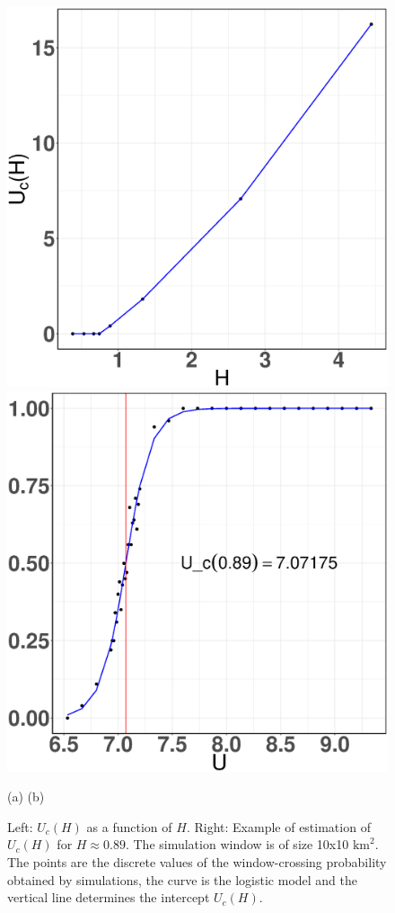 \documentclass[conference]{IEEEtran}
\begin{document}
\begin{figure}[t!]
\centerline{
\includegraphics[width=0.48\linewidth]{Figures/Uc-general-curve}
\hspace{0.01\linewidth}
\includegraphics[width=0.48\linewidth]{Figures/Uc-example}}
\vspace{-1ex}
\centerline{\footnotesize\hspace{0.25\linewidth} (a)\hspace{0.5\linewidth} (b) \hspace{0.25\linewidth}\ }
\vspace{-1ex}
\caption{Left: $U_c(H)$ as a function of $H$. Right: Example of estimation of $U_{c}(H)$ for $H\approx 0.89$. The simulation window is of size 10x10 $\text{km}^{2}$.
The points are the discrete values of the window-crossing probability obtained by simulations, the curve is the logistic model and the vertical line determines the intercept $U_{c}(H)$. }
\label{critical-user-estimation}
\vspace{-3ex}
\end{figure}
\end{document}
